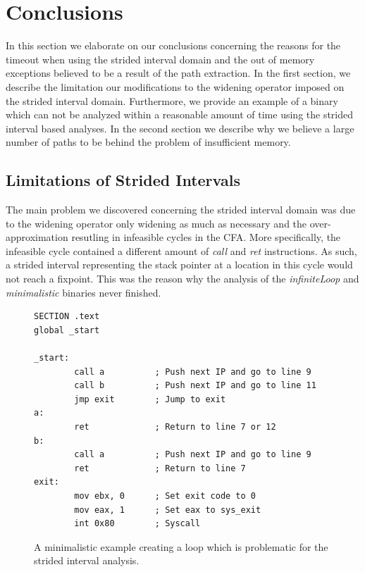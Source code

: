 \documentclass{kththesis}
\renewcommand{\it}[1]{\textit{#1}}
\begin{document}
\section{Conclusions}\label{sec:conclusions}
In this section we elaborate on our conclusions concerning the reasons for the timeout when using the strided interval domain and the out of memory exceptions believed to be a result of the path extraction. In the first section, we describe the limitation our modifications to the widening operator imposed on the strided interval domain. Furthermore, we provide an example of a binary which can not be analyzed within a reasonable amount of time using the strided interval based analyses. In the second section we describe why we believe a large number of paths to be behind the problem of insufficient memory. 
\subsection{Limitations of Strided Intervals}\label{sec:nonZeroSum}
The main problem we discovered concerning the strided interval domain was due to the widening operator only widening as much as necessary and the over-approximation resutling in infeasible cycles in the CFA. More specifically, the infeasible cycle contained a different amount of \it{call} and \it{ret} instructions. As such, a strided interval representing the stack pointer at a location in this cycle would not reach a fixpoint. This was the reason why the analysis of the \it{infiniteLoop} and \it{minimalistic} binaries never finished.  
\begin{figure}[!t]
    \centering
\begin{tcolorbox}
\begin{verbatim}
SECTION .text
global _start

_start:
        call a          ; Push next IP and go to line 9
        call b          ; Push next IP and go to line 11
        jmp exit        ; Jump to exit
a:            
        ret             ; Return to line 7 or 12
b: 
        call a          ; Push next IP and go to line 9
        ret             ; Return to line 7
exit:
        mov ebx, 0      ; Set exit code to 0
        mov eax, 1      ; Set eax to sys_exit
        int 0x80        ; Syscall
\end{verbatim}
\end{tcolorbox}
\caption{A minimalistic example creating a loop which is problematic for the strided interval analysis.}
    \label{fig:badLoop}
\end{figure}
\end{document}

